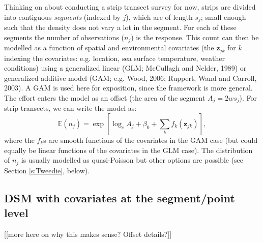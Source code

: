 \documentclass[useAMS,referee]{biom}
\begin{document}
Thinking on about conducting a strip transect survey for now, strips are divided into contiguous \textit{segments} (indexed by $j$), which are of length $s_j$; small enough such that the density does not vary a lot in the segment. For each of these segments the number of observations ($n_j$) is the response. This count can then be modelled as a function of spatial and environmental covariates (the $\mathbf{z}_{jk}$ for $k$ indexing the covariates: e.g. location, sea surface temperature, weather conditions) using a generalized linear (GLM; McCullagh and Nelder, 1989) or generalized additive model (GAM; e.g. Wood, 2006; Ruppert, Wand and Carroll, 2003). A GAM is used here for exposition, since the framework is more general. The effort enters the model as an offset (the area of the segment $A_j = 2ws_j$). For strip transects, we can write the model as:
\begin{equation}
\mathbb{E}(n_j) = \exp\left[ \log_e A_j + \beta_0 + \sum_k f_k\left(\bm{z}_{jk}\right) \right],
\label{e:stripgam}
\end{equation}
where the $f_k$s are smooth functions of the covariates in the GAM case (but could equally be linear functions of the covariates in the GLM case). The distribution of $n_j$ is usually modelled as quasi-Poisson but other options are possible (see Section \ref{s:Tweedie}, below).

\subsection{DSM with covariates at the segment/point level}

[[more here on why this makes sense? Offset details?]]
\end{document}
